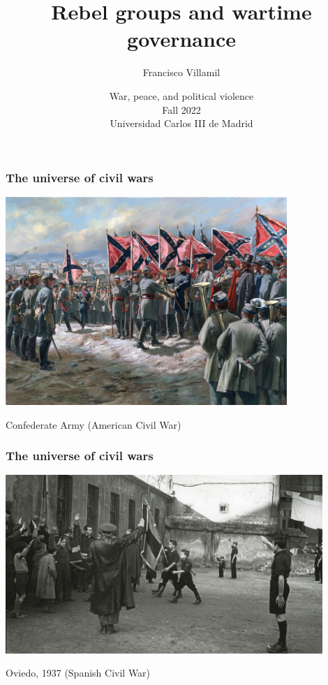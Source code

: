 \documentclass[utf8, xcolor=dvipsnames]{beamer}
\title[Rebel groups]{Rebel groups and wartime governance}
\author[Francisco Villamil]{Francisco Villamil}
\date[UC3M / Fall 2022]{War, peace, and political violence\\Fall 2022\\Universidad Carlos III de Madrid}
\begin{document}
\begin{frame}
  \titlepage
\end{frame}


\begin{frame}
\frametitle{The universe of civil wars}
\centering

\includegraphics[width = 0.8\textwidth]{img/confederate}

\vspace{15pt}

Confederate Army (American Civil War)

\end{frame}

\begin{frame}
\frametitle{The universe of civil wars}
\centering

\includegraphics[width = 0.9\textwidth]{img/gv_oviedo}

\vspace{15pt}

Oviedo, 1937 (Spanish Civil War)

\end{frame}
\end{document}
